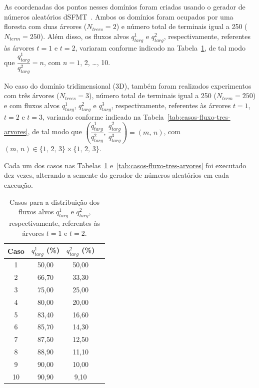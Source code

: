 As coordenadas dos pontos 
nesses domínios foram criadas usando o gerador de números aleatórios
dSFMT~\cite{Saito2009}. Ambos os domínios foram ocupados por uma 
floresta com duas árvores ($N_{trees} = 2$) e número total de terminais
igual a 250 ($N_{term} = 250$).
Além disso, os fluxos alvos $q_{targ}^1$ e $q_{targ}^2$, 
respectivamente, referentes às árvores $t = 1$ e $t = 2$, variaram 
conforme indicado na Tabela~\ref{tab:casos-fluxo-duas-arvores}, de tal modo 
que $\dfrac{q_{targ}^1}{q_{targ}^2} = n$, com $n = 1$, 2, \ldots, 10.

No caso do domínio tridimensional (3D), também foram realizados experimentos 
com três árvores ($N_{trees} = 3$), número total de terminais igual a 250 
($N_{term} = 250$) e com fluxos alvos $q_{targ}^1$, $q_{targ}^2$ e $q_{targ}^3$, 
respectivamente, referentes às árvores $t = 1$, $t = 2$ e $t = 3$, variando
conforme indicado na Tabela~\ref{tab:casos-fluxo-tres-arvores}, 
de tal modo que 
$\left(\dfrac{q_{targ}^1}{q_{targ}^2},\, \dfrac{q_{targ}^2}{q_{targ}^3}\right) = (m,\,n)$, 
com $(m,\, n) \in \{1,\, 2,\, 3\}\times \{1,\, 2,\, 3\}$.

Cada um dos casos 
nas Tabelas~\ref{tab:casos-fluxo-duas-arvores} e~\ref{tab:casos-fluxo-tres-arvores} 
foi executado dez vezes, alterando a semente do gerador de números aleatórios em cada execução.

\begin{table}[!htb]
  \centering \captiondelim{: }
  \caption{
    Casos para a distribuição dos fluxos alvos $q_{targ}^1$ e $q_{targ}^2$,
    respectivamente, referentes às árvores $t = 1$ e $t = 2$.
  }
  \begin{tabular}{|c|c|c|c|}
    \hline
    Caso & $q_{targ}^1$ (\%) & $q_{targ}^2$ (\%) \\ \hline
    1 & 50,00 & 50,00 \\ \hline
    2 & 66,70 & 33,30 \\ \hline
    3 & 75,00 & 25,00 \\ \hline
    4 & 80,00 & 20,00 \\ \hline
    5 & 83,40 & 16,60 \\ \hline
    6 & 85,70 & 14,30 \\ \hline
    7 & 87,50 & 12,50 \\ \hline
    8 & 88,90 & 11,10 \\ \hline
    9 & 90,00 & 10,00 \\ \hline
    10 & 90,90 & 9,10\\ \hline
  \end{tabular}
  \label{tab:casos-fluxo-duas-arvores}
\end{table}

